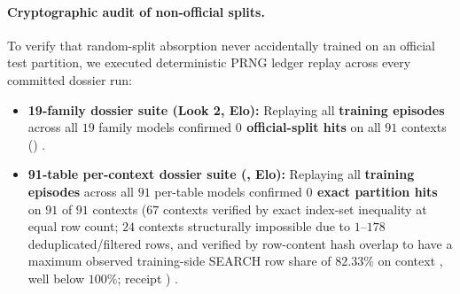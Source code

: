 \paragraph{Cryptographic audit of non-official splits.}
To verify that random-split absorption never accidentally trained on an official  test partition, we executed deterministic PRNG ledger replay across every committed dossier run:
\begin{itemize}
  \item \textbf{19-family dossier suite (Look 2, \BHEloRecall{} Elo):} Replaying all \textbf{\BHSpecialistCommits{} training episodes} across all $19$ family models confirmed \textbf{$0$ official-split hits} on all $91$ contexts () \est{}.
  \item \textbf{91-table per-context dossier suite (, \BHEloGenTwoA{} Elo):} Replaying all \textbf{\BHGenTwoAEpisodes{} training episodes} across all $91$ per-table models confirmed \textbf{$0$ exact partition hits} on $91$ of $91$ contexts ($67$ contexts verified by exact index-set inequality at equal row count; $24$ contexts structurally impossible due to $1$--$178$ deduplicated/filtered rows, and verified by row-content hash overlap to have a maximum observed training-side SEARCH row share of \textbf{$82.33\%$} on context , well below $100\%$; receipt ) \est{}.
\end{itemize}
